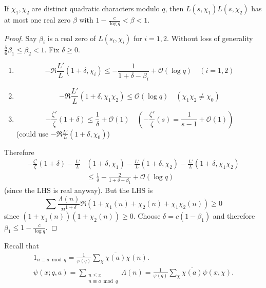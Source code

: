 \documentclass{article}
\newcommand{\1}{\mathbbm{1}}
\newcommand{\bigO}{\mathcal{O}}
\begin{document}
\begin{thm}
  \newlec
  If $\chi_1,\chi_2$ are distinct quadratic characters modulo $q$, then
  $L(s,\chi_1) L(s,\chi_2)$ has at most one real zero $\beta$ with $1 - \frac{c}{\log q} < \beta < 1$.
\end{thm}
\begin{proof}
  Say $\beta_i$ is a real zero of $L(s_i, \chi_i)$ for $i=1,2$. Without loss of generality $\frac{5}{6} \beta_1 \leq \beta_2 < 1$. Fix $\delta \geq 0$.
  \begin{enumerate}
    \item
      \begin{equation*}
        -\Re \frac{L'}{L}(1+\delta,\chi_i) \leq -\frac{1}{1+\delta-\beta_i} + \bigO(\log q) \quad (i=1,2)
      \end{equation*}
    \item
      \begin{equation*}
        -\Re \frac{L'}{L}(1+\delta,\chi_1\chi_2) \leq \bigO(\log q) \quad (\chi_1 \chi_2 \neq \chi_0)
      \end{equation*}
    \item
      \begin{equation*}
        -\frac{\zeta'}{\zeta}(1+\delta) \leq \frac{1}{\delta} + \bigO(1) \quad \left(-\frac{\zeta'}{\zeta}(s) = \frac{1}{s-1}+ \bigO(1)\right)
      \end{equation*}
      (could use $-\Re \frac{L'}{L}(1+\delta,\chi_0)$)
  \end{enumerate}
  Therefore
  \begin{align*}
    -\frac{\zeta'}{\zeta}(1+\delta) - \frac{L'}{L}&(1+\delta,\chi_1) - \frac{L'}{L}(1+\delta,\chi_2) - \frac{L'}{L}(1+\delta,\chi_1\chi_2) \\&\leq \frac{1}{\delta} - \frac{2}{1+\delta-\beta_1} + \bigO(\log q)
  \end{align*}
  (since the LHS is real anyway).
  But the LHS is
  \begin{equation*}
    \sum \frac{\Lambda(n)}{n^{1+\delta}} \Re(1 + \chi_1(n) + \chi_2(n) + \chi_1\chi_2(n)) \geq 0
  \end{equation*}
  since $(1+\chi_1(n))(1+\chi_2(n)) \geq 0$.
  Choose $\delta = c(1-\beta_1)$ and therefore $\beta_1 \leq 1- \frac{c}{\log q}$.
\end{proof}
Recall that
\begin{gather*}
  1_{n \equiv a \bmod{q}} = \frac{1}{\varphi(q)} \sum_\chi \overline{\chi(a)} \chi(n). \\
  \psi(x;q,a) = \sum_{\substack{n \leq x \\ n \equiv a \bmod{q}}} \Lambda(n) = \frac{1}{\varphi(q)} \sum_\chi \overline{\chi(a)} \psi(x,\chi).
\end{gather*}
\end{document}
